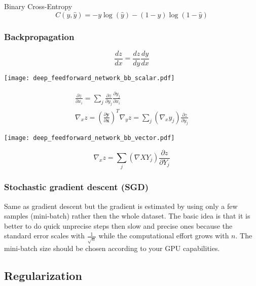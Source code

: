 Binary Cross-Entropy
\begin{equation*}
    C(y,\hat{y}) = -y\log(\hat{y})-(1-y)\log(1-\hat{y})
\end{equation*}

\subsubsection{Backpropagation}

\begin{equation*}
    \frac{dz}{dx} = \frac{dz}{dy}\frac{dy}{dx}
\end{equation*}

\begin{center}
    \texttt{[image: deep\_feedforward\_network\_bb\_scalar.pdf]}
\end{center}

\begin{gather*}
    \frac{\partial z}{\partial x_i} = \sum_{j}\frac{\partial z}{\partial y_j}\frac{\partial y_j}{\partial x_i} \\
    \nabla_x z = {\left(\frac{\partial \mathbf{y}}{\partial \mathbf{x}}\right)}^T \nabla_y z = \sum_{j}(\nabla_x y_j)\frac{\partial z}{\partial y_j}
\end{gather*}

\begin{center}
    \texttt{[image: deep\_feedforward\_network\_bb\_vector.pdf]}
\end{center}

\begin{equation*}
    \nabla_x z = \sum_{j}(\nabla X Y_j)\frac{\partial z}{\partial Y_j}
\end{equation*}

\subsubsection{Stochastic gradient descent (SGD)}

Same as gradient descent but the gradient is estimated by using only a few samples (mini-batch) rather then the whole dataset. The basic idea is that it is better to do quick unprecise steps then slow and precise ones because the standard error scales with $\frac{1}{\sqrt{n}}$ while the computational effort grows with $n$. The mini-batch size should be chosen according to your GPU capabilities.

\subsection{Regularization}

